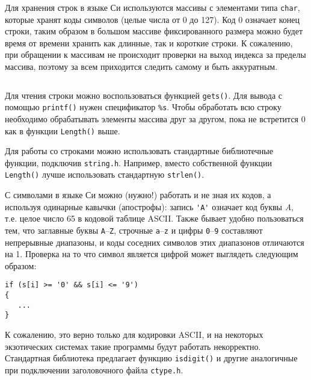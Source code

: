 Для хранения строк в языке Си используются массивы с элементами типа
\texttt{char}, которые хранят коды символов (целые числа от 0 до 127). Код 0
означает конец строки, таким образом в большом массиве фиксированного размера
можно будет время от времени хранить как длинные, так и короткие строки. К
сожалению, при обращении к массивам не происходит проверки на выход индекса за
пределы массива, поэтому за всем приходится следить самому и быть аккуратным.
%
\inputminted{c}{samples/string.c}

Для чтения строки можно воспользоваться функцией \texttt{gets()}. Для вывода
с помощью \texttt{printf()} нужен спецификатор \verb|%s|. Чтобы обработать
всю строку необходимо обрабатывать элементы массива друг за другом, пока не
встретится 0 как в функции \texttt{Length()} выше.

Для работы со строками можно использовать стандартные библиотечные функции,
подключив \texttt{string.h}. Например, вместо собственной функции
\texttt{Length()} лучше использовать стандартную \texttt{strlen()}.

С символами в языке Си можно (нужно!) работать и не зная их кодов, а используя
одинарные кавычки (апострофы): запись \verb|'A'| означает код буквы
\textit{A}, т.е. целое число 65 в кодовой таблице ASCII. Также бывает удобно
пользоваться тем, что заглавные буквы \texttt{A}--\texttt{Z}, строчные
\texttt{a}--\texttt{z} и цифры \texttt{0}--\texttt{9} составляют непрерывные
диапазоны, и коды соседних символов этих диапазонов отличаются на 1. Проверка
на то что символ является цифрой может выглядеть следующим образом:
%
\begin{verbatim}
if (s[i] >= '0' && s[i] <= '9')
{
   ...
}
\end{verbatim}

К сожалению, это верно только для кодировки ASCII, и на некоторых экзотических
системах такие программы будут работать некорректно. Стандартная библиотека
предлагает функцию \texttt{isdigit()} и другие аналогичные при подключении
заголовочного файла \texttt{ctype.h}.
